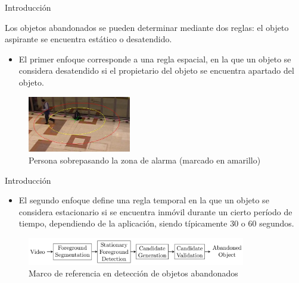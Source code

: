 \begin{frame}{Introducción}

\justifying
Los objetos abandonados se pueden determinar mediante dos reglas: el objeto aspirante se encuentra estático o desatendido.

\vspace{0.1cm}

\begin{itemize}
    \justifying
    \item El primer enfoque corresponde a una regla espacial, en la que un objeto se considera desatendido si el propietario del objeto se encuentra apartado del objeto.
    
\end{itemize}
    
\vspace{0.3cm}

\begin{figure}[ht]
\centering
\includegraphics[width=0.4\textwidth]{Images/introduccion/pets2006-3m.jpeg}
\caption{\label{fig:pets2006-3m}Persona sobrepasando la zona de alarma (marcado en amarillo)}
\end{figure}
    
\end{frame}


\begin{frame}{Introducción}

\begin{itemize}
    \justifying
    \item El segundo enfoque define una regla temporal en la que un objeto se considera estacionario si se encuentra inmóvil durante un cierto período de tiempo, dependiendo de la aplicación, siendo típicamente 30 o 60 segundos.
    
\end{itemize}
    
\vspace{0.3cm}

\begin{figure}[ht]
\centering
\includegraphics[width=0.85\textwidth]{Images/introduccion/canonical-framework-aod.png}
\caption{\label{fig:canonical-framework-aod}Marco de referencia en detección de objetos abandonados}
\end{figure}

\end{frame}


